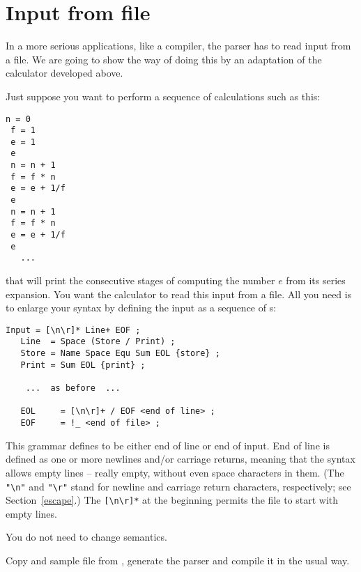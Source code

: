 
\section{Input from file\label{file}}


In a more serious applications, like a compiler, the parser has to read 
input from a file.
We are going to show the way of doing this by an adaptation
of the calculator developed above.

Just suppose you want to perform a sequence of calculations such as this:

\small
\begin{Verbatim}[samepage=true,xleftmargin=15mm,baselinestretch=0.8]
 n = 0  
 f = 1
 e = 1
 e
 n = n + 1 
 f = f * n
 e = e + 1/f  
 e
 n = n + 1 
 f = f * n
 e = e + 1/f  
 e
   ...
\end{Verbatim}
\normalsize

that will print the consecutive stages of computing the number $e$
from its series expansion.
You want the calculator to read this input from a file.
All you need is to enlarge your syntax by defining the input
as a sequence of s:

\small
\begin{Verbatim}[frame=single,framesep=2mm,samepage=true,xleftmargin=15mm,xrightmargin=15mm,baselinestretch=0.8]
   Input = [\n\r]* Line+ EOF ;
   Line  = Space (Store / Print) ;
   Store = Name Space Equ Sum EOL {store} ;
   Print = Sum EOL {print} ;

    ...  as before  ...   

   EOL     = [\n\r]+ / EOF <end of line> ;
   EOF     = !_ <end of file> ;
\end{Verbatim}
\normalsize

This grammar defines  to be either end of line
or end of input.
End of line is defined as one or more newlines and/or carriage returns,
meaning that the syntax allows empty lines -- really empty, without
even space characters in them.
(The \verb#"\n"# and \verb#"\r"# stand for newline and carriage
return characters, respectively; see Section~\ref{escape}.)
The \verb#[\n\r]*# at the beginning permits the file to start with empty lines.

You do not need to change semantics.

Copy  and sample file  from ,
generate the parser and compile it in the usual way.

